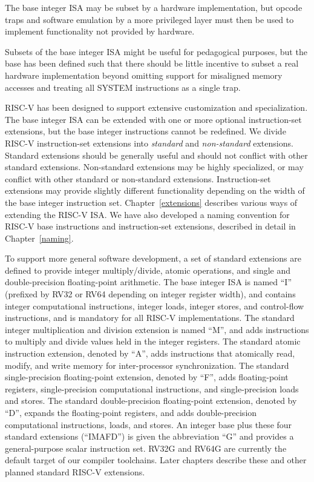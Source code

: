 The base integer ISA may be subset by a hardware implementation, but
opcode traps and software emulation by a more privileged layer must
then be used to implement functionality not provided by hardware.

\begin{commentary}
Subsets of the base integer ISA might be useful for pedagogical
purposes, but the base has been defined such that there should be
little incentive to subset a real hardware implementation beyond
omitting support for misaligned memory accesses and treating all SYSTEM
instructions as a single trap.
\end{commentary}

RISC-V has been designed to support extensive customization and
specialization.  The base integer ISA can be extended with one or more
optional instruction-set extensions, but the base integer instructions
cannot be redefined.  We divide RISC-V instruction-set extensions
into {\em standard} and {\em non-standard} extensions.  Standard
extensions should be generally useful and should not conflict with
other standard extensions.  Non-standard extensions may be highly
specialized, or may conflict with other standard or non-standard
extensions.  Instruction-set extensions may provide slightly different
functionality depending on the width of the base integer instruction
set.  Chapter~\ref{extensions} describes various ways of extending the
RISC-V ISA.  We have also developed a naming convention for RISC-V
base instructions and instruction-set extensions, described in detail
in Chapter~\ref{naming}.

To support more general software development, a set of standard
extensions are defined to provide integer multiply/divide, atomic
operations, and single and double-precision floating-point arithmetic.
The base integer ISA is named ``I'' (prefixed by RV32 or RV64
depending on integer register width), and contains integer
computational instructions, integer loads, integer stores, and
control-flow instructions, and is mandatory for all RISC-V
implementations.  The standard integer multiplication and division
extension is named ``M'', and adds instructions to multiply and divide
values held in the integer registers.  The standard atomic instruction
extension, denoted by ``A'', adds instructions that atomically read,
modify, and write memory for inter-processor synchronization.  The
standard single-precision floating-point extension, denoted by ``F'',
adds floating-point registers, single-precision computational
instructions, and single-precision loads and stores.  The standard
double-precision floating-point extension, denoted by ``D'', expands
the floating-point registers, and adds double-precision computational
instructions, loads, and stores.  An integer base plus these four
standard extensions (``IMAFD'') is given the abbreviation ``G'' and
provides a general-purpose scalar instruction set.  RV32G and RV64G
are currently the default target of our compiler toolchains.  Later
chapters describe these and other planned standard RISC-V extensions.


